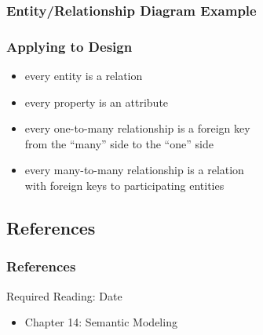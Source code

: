 \documentclass[dvipsnames]{beamer}
\begin{document}
\begin{frame}
  \frametitle{Entity/Relationship Diagram Example}

  \begin{center}
  \end{center}
\end{frame}

\begin{frame}
  \frametitle{Applying to Design}

  \begin{itemize}
    \item every entity is a relation
    \item every property is an attribute

    \pause
    \medskip
    \item every one-to-many relationship is a foreign key\\
      from the ``many'' side to the ``one'' side

    \pause
    \medskip
    \item every many-to-many relationship is a relation\\
      with foreign keys to participating entities
 \end{itemize}
\end{frame}

\subsection*{References}

\begin{frame}
  \frametitle{References}

  \begin{block}{Required Reading: Date}
    \begin{itemize}
      \item Chapter 14: \alert{Semantic Modeling}
    \end{itemize}
  \end{block}
\end{frame}
\end{document}
